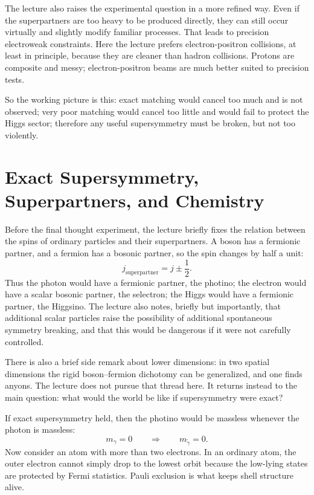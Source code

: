 The lecture also raises the experimental question in a more refined way. Even if the superpartners are too heavy to be produced directly, they can still occur virtually and slightly modify familiar processes. That leads to precision electroweak constraints. Here the lecture prefers electron-positron collisions, at least in principle, because they are cleaner than hadron collisions. Protons are composite and messy; electron-positron beams are much better suited to precision tests.

So the working picture is this: exact matching would cancel too much and is not observed; very poor matching would cancel too little and would fail to protect the Higgs sector; therefore any useful supersymmetry must be broken, but not too violently.

\section{Exact Supersymmetry, Superpartners, and Chemistry}

Before the final thought experiment, the lecture briefly fixes the relation between the spins of ordinary particles and their superpartners. A boson has a fermionic partner, and a fermion has a bosonic partner, so the spin changes by half a unit:
\begin{equation}
j_{\text{superpartner}} = j \pm \frac{1}{2}.
\end{equation}
Thus the photon would have a fermionic partner, the photino; the electron would have a scalar bosonic partner, the selectron; the Higgs would have a fermionic partner, the Higgsino. The lecture also notes, briefly but importantly, that additional scalar particles raise the possibility of additional spontaneous symmetry breaking, and that this would be dangerous if it were not carefully controlled.

There is also a brief side remark about lower dimensions: in two spatial dimensions the rigid boson--fermion dichotomy can be generalized, and one finds anyons. The lecture does not pursue that thread here. It returns instead to the main question: what would the world be like if supersymmetry were exact?

If exact supersymmetry held, then the photino would be massless whenever the photon is massless:
\begin{equation}
m_\gamma = 0
\qquad \Rightarrow \qquad
m_{\tilde\gamma}=0.
\end{equation}
Now consider an atom with more than two electrons. In an ordinary atom, the outer electron cannot simply drop to the lowest orbit because the low-lying states are protected by Fermi statistics. Pauli exclusion is what keeps shell structure alive.

